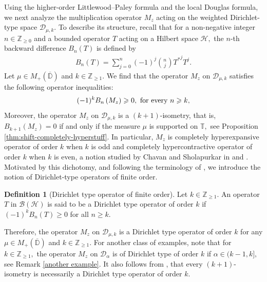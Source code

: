 \documentclass[10pt,oneside,reqno]{amsart}
\theoremstyle{definition}
\newtheorem*{definition*}{Definition}
\theoremstyle{remark}
\newcommand{\calB}{{\mathcal{B}}}
\newcommand{\calH}{{\mathcal{H}}}
\renewcommand{\ge}{\geqslant}
\newcommand{\D}{\mathbb D}
\newcommand{\T}{\mathbb T}
\numberwithin{equation}{section}
\begin{document}
Using the higher-order Littlewood–Paley formula and the local Douglas formula, we next analyze the multiplication operator $M_z$ acting on the weighted Dirichlet-type space $\mathscr{D}_{\mu,k}.$
To describe its structure, recall that for a non-negative integer $n\in \mathbb Z_{\geqslant 0}$ and a bounded operator $T$ acting on a Hilbert space $\mathcal H,$  the $n$-th backward difference $B_n(T)$ is defined by
\begin{align*}
    B_n(T)= \sum\limits_{j=0}^n (-1)^j\binom{n}{j}{T^*}^j T^j.
\end{align*} 
Let $\mu\in M_+(\overline{\D})$ and $k\in \mathbb Z_{\geqslant 1}.$ We find that the operator $M_z$ on $\mathscr D_{\mu,k}$ satisfies the following operator inequalities: 
\begin{align*}
    (-1)^kB_{n} \left( M_z \right) \ge 0, \,\,\mbox{for every\,\,} n \ge k,
\end{align*}
 Moreover, the operator $M_z$ on $\mathscr D_{\mu,k}$ is a $(k+1)$-isometry, that is, $B_{k+1} \left( M_z \right)=0$ if and only if the measure $\mu$ is supported on $\T,$ see  Proposition \ref{thm:shift-completely-hyperstuff}. In particular, $M_z$ is completely hyperexpansive operator of order $k$ when $k$ is odd and completely hypercontractive operator of order $k$ when $k$ is even, a notion studied by Chavan and Sholapurkar in \cite[Sec.~3]{CS17} and \cite[Sec.~4]{CMF}. Motivated by this dichotomy, and following the terminology of \cite[IV, Definition~1.2]{1993multiplication}, we introduce the notion of Dirichlet-type operators of finite order.
 
 

\begin{definition*}[Dirichlet type operator of finite order]
Let $k\in\mathbb Z_{\geqslant 1}.$ An operator $T$ in $\calB \left( \calH \right)$ is said to be a Dirichlet type operator of order $k$ if $(-1)^kB_{n} \left( T \right) \ge 0$ for all $n \ge k.$ 
\end{definition*}

Therefore, the operator $M_z$ on $\mathscr D_{\mu,k}$ is a Dirichlet type operator of order $k$ for any $\mu\in M_+(\overline{\D})$ and $k\in\mathbb Z_{\geqslant 1}.$ For another class of examples, note that for $k\in\mathbb Z_{\geqslant 1},$  the operator $M_z$ on $\mathscr D_{\alpha}$ is of Dirichlet type of order $k$ if $\alpha\in (k-1,k],$ see Remark \ref{another example}. It also follows from \cite[Theorem 2.5]{2015Gu}, that every $(k+1)$-isometry is necessarily a Dirichlet type operator of order $k.$ 
\end{document}

